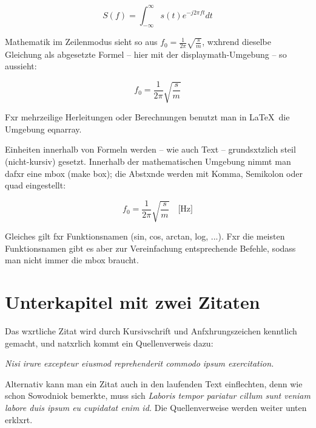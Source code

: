             \begin{equation}\label{gl_fourier}
            S(f) = \int_{-\infty}^{\infty} s(t)e^{-j 2 \pi f t}dt
            \end{equation}

            Mathematik im Zeilenmodus sieht so aus $f_0 = \frac{1}{2\pi} \sqrt{\frac{s}{m}}$, wxhrend dieselbe Gleichung als abgesetzte Formel -- hier mit der displaymath-Umgebung -- so aussieht: 

            \begin{displaymath}
            f_0 = \frac{1}{2\pi} \sqrt{\frac{s}{m}} 
            \end{displaymath}

            Fxr mehrzeilige Herleitungen oder Berechnungen benutzt man in \LaTeX\ die Umgebung eqnarray.

            Einheiten innerhalb von Formeln werden -- wie auch Text -- grundsxtzlich steil (nicht-kursiv) gesetzt. Innerhalb der mathematischen Umgebung nimmt man dafxr eine mbox (make box); die Abstxnde werden mit Komma, Semikolon oder quad eingestellt:

            \begin{displaymath}
            f_0 = \frac{1}{2\pi} \sqrt{\frac{s}{m}} \quad \mbox{[Hz]}
            \end{displaymath}

            Gleiches gilt fxr Funktionsnamen (sin, cos, arctan, log, ...). Fxr die meisten Funktionsnamen gibt es aber zur Vereinfachung entsprechende Befehle, sodass man nicht immer die mbox braucht.


        \section{Unterkapitel mit zwei Zitaten}

            Das wxrtliche Zitat wird durch Kursivschrift und Anfxhrungszeichen kenntlich gemacht, und natxrlich kommt ein Quellenverweis dazu:

            \medskip
            \emph{Nisi irure excepteur eiusmod reprehenderit commodo ipsum exercitation.}
            \medskip

            Alternativ kann man ein Zitat auch in den laufenden Text einflechten, denn wie schon Sowodniok bemerkte, muss sich 
            \emph{Laboris tempor pariatur cillum sunt veniam labore duis ipsum eu cupidatat enim id.}
            Die Quellenverweise werden weiter unten erklxrt.


